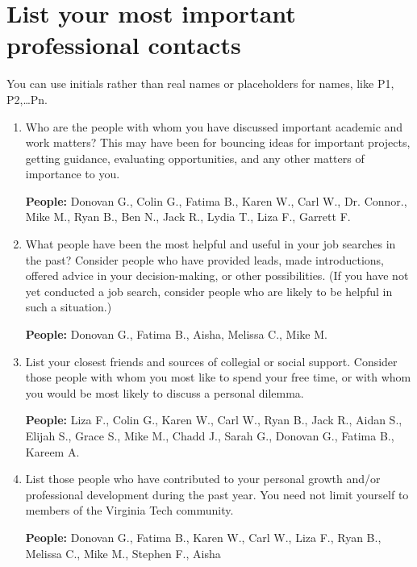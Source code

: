 \documentclass[12pt]{article}
\begin{document}
\maketitlepage

\section{List your most important professional contacts}

You can use initials rather than real names or placeholders for names, 
like P1, P2,…Pn. 

\begin{enumerate}
    \item Who are the people with whom you have discussed important academic 
    and work matters? This may have been for bouncing ideas for important projects, 
    getting guidance, evaluating opportunities, and any other matters of importance 
    to you.

    \textbf{People:} Donovan G., Colin G., Fatima B., Karen W., Carl W., 
    Dr. Connor., Mike M., Ryan B., Ben N., Jack R., Lydia T., Liza F., Garrett F.

    \item What people have been the most helpful and useful in your job searches 
    in the past? Consider people who have provided leads, made introductions, 
    offered advice in your decision-making, or other possibilities. (If you have 
    not yet conducted a job search, consider people who are likely to be helpful 
    in such a situation.)

    \textbf{People:} Donovan G., Fatima B., Aisha, Melissa C., Mike M.

    \item List your closest friends and sources of collegial or social support. 
    Consider those people with whom you most like to spend your free time, or 
    with whom you would be most likely to discuss a personal dilemma.

    \textbf{People:} Liza F., Colin G., Karen W., Carl W., Ryan B., 
    Jack R., Aidan S., Elijah S., Grace S., Mike M., Chadd J., 
    Sarah G., Donovan G., Fatima B., Kareem A.

    \item List those people who have contributed to your personal growth 
    and/or professional development during the past year. You need not limit 
    yourself to members of the Virginia Tech community.

    \textbf{People:} Donovan G., Fatima B., Karen W., Carl W., Liza F., 
    Ryan B., Melissa C., Mike M., Stephen F., Aisha

\end{enumerate}
\end{document}
